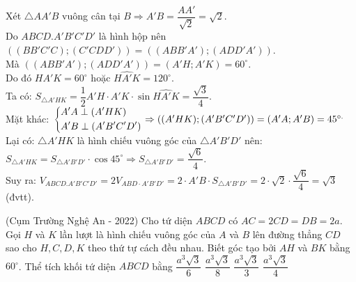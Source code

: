 \begin{ex}
{		Xét $\triangle AA'B$ vuông cân tại $B\Rightarrow A'B=\dfrac{AA'}{\sqrt{2}}=\sqrt{2}$.\\
		Do $ABCD.A'B'C'D'$ là hình hộp nên $\left((BB'C'C);(C'CDD')\right)=\left((ABB'A');(ADD'A')\right)$.\\
		Mà $\left((ABB'A');(ADD'A')\right)=(A'H;A'K)=60^{\circ}$.\\
		Do đó $\widehat{HA'K}=60^{\circ}$ hoặc $\widehat{HA'K}=120^{\circ}$.\\
		Ta có: $S_{\triangle A'HK}=\dfrac{1}{2}A'H\cdot A'K\cdot\sin\widehat{HA'K}=\dfrac{\sqrt{3}}{4}$.\\
		Mặt khác: $\left\{\begin{aligned}&A'A\perp(A'HK)\\&A'B\perp(A'B'C'D')\end{aligned}\right.\Rightarrow\left((A'HK);(A'B'C'D')\right)=(A'A;A'B)=45^{\circ.}$ \\
		Lại có: $\triangle A'HK$ là hình chiếu vuông góc của $\triangle A'B'D'$ nên:\\
		$S_{\triangle A'HK}=S_{\triangle A'B'D'}\cdot\cos 45^{\circ}\Rightarrow S_{\triangle A'B'D'}=\dfrac{\sqrt{6}}{4}$.\\
		Suy ra: $V_{ABCD.A'B'C'D'}=2V_{ABD\cdot A'B'D'}=2\cdot A'B\cdot S_{\triangle A'B'D'}=2\cdot\sqrt{2}\cdot\dfrac{\sqrt{6}}{4}=\sqrt{3}$ (đvtt).}
\end{ex}
\begin{ex}%
	(Cụm Trường Nghệ An - 2022) Cho tứ diện $ABCD$ có $AC=2CD=DB=2a$. Gọi $H$ và $K$ lần lượt là hình chiếu vuông góc của $A$ và $B$ lên đường thẳng $CD$ sao cho $H,C,D,K$ theo thứ tự cách đều nhau. Biết góc tạo bởi $AH$ và $BK$ bằng $60^{\circ}$. Thể tích khối tứ diện $ABCD$ bằng
	\choice
	{$\dfrac{a^3\sqrt{3}}{6}$}
	{$\dfrac{a^3\sqrt{3}}{8}$}
	{$\dfrac{a^3\sqrt{3}}{3}$}
	{\True $\dfrac{a^3\sqrt{3}}{4}$}
\end{ex}
